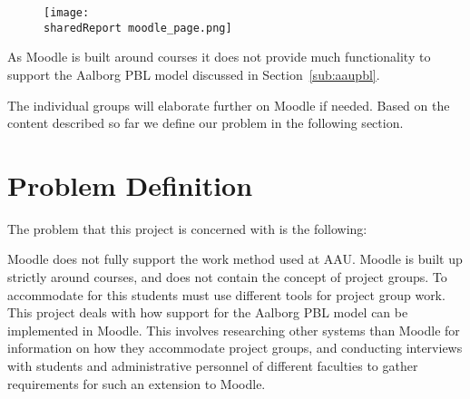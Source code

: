 \begin{figure}
\texttt{[image: \\sharedReport moodle\_page.png]}
\label{fig:MoodleCourse}
\end{figure}

As Moodle is built around courses it does not provide much functionality to support the Aalborg PBL model discussed in Section~\ref{sub:aaupbl}. %

The individual groups will elaborate further on Moodle if needed.
Based on the content described so far we define our problem in the following section.




\section{Problem Definition}
\label{sec:problemDef}
The problem that this project is concerned with is the following:

Moodle does not fully support the work method used at AAU. 
Moodle is built up strictly around courses, and does not contain the concept of project groups. 
To accommodate for this students must use different tools for project group work.
This project deals with how support for the Aalborg PBL model can be implemented in Moodle. %
This involves researching other systems than Moodle for information on how they accommodate project groups, and conducting interviews with students and administrative personnel of different faculties to gather requirements for such an extension to Moodle.